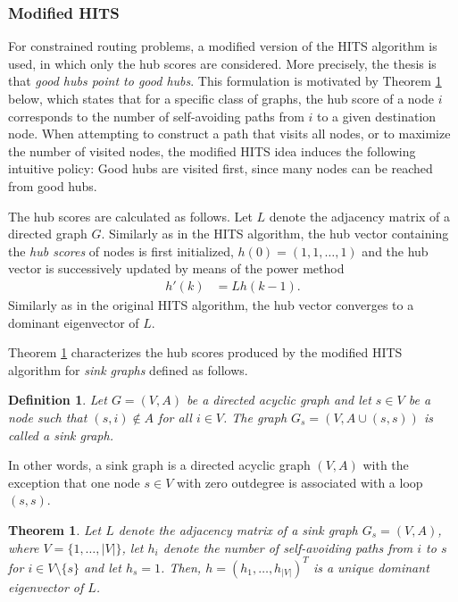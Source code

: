\documentclass[dissertation,draft*]{aaltoseries}
\newtheorem{theorem}{Theorem}
\newtheorem*{definition}{Definition}
\begin{document}
\subsubsection{Modified HITS}
\label{modifiedhits}
For constrained routing problems, a modified version of the HITS algorithm is used, in which only the hub scores
are considered. More precisely, the thesis is that \emph{good hubs point to good hubs}. 
This formulation is motivated by Theorem \ref{polut} below, which states that for a specific class of graphs,
the hub score of a node $i$ corresponds to the number of self-avoiding paths
from $i$ to a given destination node.
When attempting to construct a path that visits all nodes, or to maximize the number of visited nodes, 
the modified HITS idea induces the following intuitive policy: 
Good hubs are visited first, since many nodes can be reached from good hubs. 

The hub scores are calculated as follows.
Let $L$ denote the adjacency matrix of a directed graph $G$. 
Similarly as in the HITS algorithm, the hub vector containing the \emph{hub scores} of nodes is first initialized, $h(0) = (1,1,\ldots,1)$ 
and the hub vector is successively updated by means of the power method
\begin{align}
\label{modhub}
h'(k) & = L h(k-1).
\end{align}
Similarly as in the original HITS algorithm, the hub vector
converges to a dominant eigenvector of $L$.

Theorem \ref{polut} characterizes the hub scores produced by the modified HITS algorithm for 
\emph{sink graphs} defined as follows.
\begin{definition}
\label{sinkg}
Let $G=(V,A)$ be a directed acyclic graph and let $s \in V$ be a node such that $(s,i) \notin A$ for all $i \in V$.
The graph $G_s=(V, A \cup (s,s))$ is called a \emph{sink graph}. 
\end{definition}
In other words, a sink graph is a directed acyclic graph $(V,A)$ with the exception that one node $s \in V$ with zero outdegree is
associated with a loop $(s,s)$.

\begin{theorem}
\label{polut}
Let $L$ denote the adjacency matrix of a sink graph $G_s=(V,A)$, where $V=\{1,\ldots,|V|\}$,  
let $h_i$ denote the number of self-avoiding paths from $i$ to $s$ for $i \in V \setminus \{s\}$ and let $h_s=1$. 
Then, $h=(h_1,\ldots,h_{|V|})^T$ is a unique dominant eigenvector of $L$.
\end{theorem}
\end{document}
